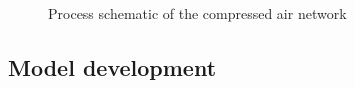 	\begin{figure}[h!]
		\centering
		\caption{Process schematic of the compressed air network}
		\label{fig: KUS Air layout}
	\end{figure}
\clearpage

\subsection{Model development}
	
